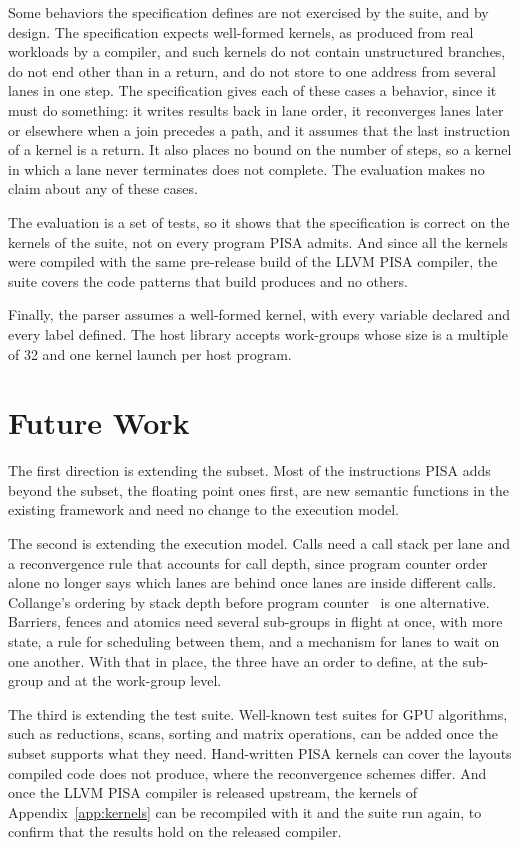 Some behaviors the specification defines are not exercised by the
suite, and by design. The specification expects well-formed kernels, as
produced from real workloads by a compiler, and such kernels do not
contain unstructured branches, do not end other than in a return, and
do not store to one address from several lanes in one step. The
specification gives each of these cases a behavior, since it must do
something: it writes results back in lane order, it reconverges lanes
later or elsewhere when a join precedes a path, and it assumes that the
last instruction of a kernel is a return. It also places no bound on
the number of steps, so a kernel in which a lane never terminates does
not complete. The evaluation makes no claim about any of these cases.

The evaluation is a set of tests, so it shows that the specification
is correct on the kernels of the suite, not on every program PISA
admits. And since all the kernels were compiled with the same
pre-release build of the LLVM PISA compiler, the suite covers the code
patterns that build produces and no others.

Finally, the parser assumes a well-formed kernel, with every variable
declared and every label defined. The host
library accepts work-groups whose size is a multiple of 32 and one
kernel launch per host program.

\section{Future Work}

The first direction is extending the subset. Most of the instructions
PISA adds beyond the subset, the floating point ones first, are new
semantic functions in the existing framework and need no change to the
execution model.

The second is extending the execution model. Calls need a call stack
per lane and a reconvergence rule that accounts for call depth, since
program counter order alone no longer says which lanes are behind once
lanes are inside different calls. Collange's ordering by stack depth
before program counter~\cite{collange-stackless} is one alternative.
Barriers, fences and atomics need several sub-groups in flight at once,
with more state, a rule for scheduling between them, and a mechanism
for lanes to wait on one another. With that in place, the three have
an order to define, at the sub-group and at the work-group level.

The third is extending the test suite. Well-known test suites for GPU
algorithms, such as reductions, scans, sorting and matrix operations,
can be added once the subset supports what they need. Hand-written
PISA kernels can cover the layouts compiled code does not produce,
where the reconvergence schemes differ. And once the LLVM PISA compiler
is released upstream, the kernels of Appendix~\ref{app:kernels} can be
recompiled with it and the suite run again, to confirm that the results
hold on the released compiler.

